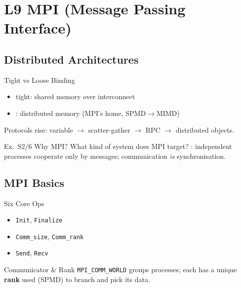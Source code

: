 \section{L9 MPI (Message Passing Interface)}

\subsection{Distributed Architectures}

\begin{concept}{Tight vs Loose Binding}
    \begin{itemize}
        \item tight: shared memory over interconnect
        \item {}: distributed memory (MPI's home, SPMD$\to$MIMD)
    \end{itemize}
    Protocols rise: variable $\to$ scatter-gather $\to$ RPC $\to$ distributed objects.
\end{concept}

\begin{example2}{Ex.\ S2/6 Why MPI?}
    What kind of system does MPI target?
    \tcblower
    : independent processes cooperate only by messages; communication \emph{is} synchronisation.
\end{example2}

\subsection{MPI Basics}


\begin{definition}{Six Core Ops}
    \begin{itemize}
        \item \texttt{Init}, \texttt{Finalize}
        \item \texttt{Comm\_size}, \texttt{Comm\_rank}
        \item \texttt{Send}, \texttt{Recv}
    \end{itemize}
\end{definition}

\begin{definition}{Communicator \& Rank}
    \texttt{MPI\_COMM\_WORLD} groups processes; each has a unique \textbf{rank} used (SPMD) to branch and pick its data.
\end{definition}

\multend

